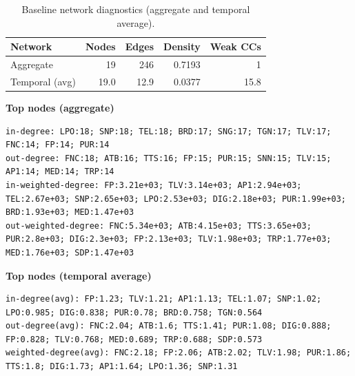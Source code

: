 \begin{table}[ht]
\centering
\small
\begin{tabular}{l r r r r}
\hline
Network & Nodes & Edges & Density & Weak CCs \\
\hline
Aggregate & 19 & 246 & 0.7193 & 1 \\
Temporal (avg) & 19.0 & 12.9 & 0.0377 & 15.8 \\
\hline
\end{tabular}
\caption{Baseline network diagnostics (aggregate and temporal average).}
\label{tab:network_summary}
\end{table}

\noindent\textbf{Top nodes (aggregate)}\\
\begin{verbatim}
in-degree: LPO:18; SNP:18; TEL:18; BRD:17; SNG:17; TGN:17; TLV:17; FNC:14; FP:14; PUR:14
out-degree: FNC:18; ATB:16; TTS:16; FP:15; PUR:15; SNN:15; TLV:15; AP1:14; MED:14; TRP:14
in-weighted-degree: FP:3.21e+03; TLV:3.14e+03; AP1:2.94e+03; TEL:2.67e+03; SNP:2.65e+03; LPO:2.53e+03; DIG:2.18e+03; PUR:1.99e+03; BRD:1.93e+03; MED:1.47e+03
out-weighted-degree: FNC:5.34e+03; ATB:4.15e+03; TTS:3.65e+03; PUR:2.8e+03; DIG:2.3e+03; FP:2.13e+03; TLV:1.98e+03; TRP:1.77e+03; MED:1.76e+03; SDP:1.47e+03
\end{verbatim}

\noindent\textbf{Top nodes (temporal average)}\\
\begin{verbatim}
in-degree(avg): FP:1.23; TLV:1.21; AP1:1.13; TEL:1.07; SNP:1.02; LPO:0.985; DIG:0.838; PUR:0.78; BRD:0.758; TGN:0.564
out-degree(avg): FNC:2.04; ATB:1.6; TTS:1.41; PUR:1.08; DIG:0.888; FP:0.828; TLV:0.768; MED:0.689; TRP:0.688; SDP:0.573
weighted-degree(avg): FNC:2.18; FP:2.06; ATB:2.02; TLV:1.98; PUR:1.86; TTS:1.8; DIG:1.73; AP1:1.64; LPO:1.36; SNP:1.31
\end{verbatim}
